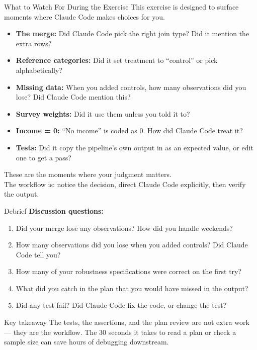 \begin{frame}{What to Watch For During the Exercise}
  This exercise is designed to surface moments where Claude Code makes choices for you.

  \vspace{0.5em}
  \begin{itemize}
    \small
    \item \textbf{The merge:} Did Claude Code pick the right join type? Did it mention the extra rows?
    \item \textbf{Reference categories:} Did it set treatment to ``control'' or pick alphabetically?
    \item \textbf{Missing data:} When you added controls, how many observations did you lose? Did Claude Code mention this?
    \item \textbf{Survey weights:} Did it use them unless you told it to?
    \item \textbf{Income = 0:} ``No income'' is coded as 0. How did Claude Code treat it?
    \item \textbf{Tests:} Did it copy the pipeline's own output in as an expected value, or edit one to get a pass?
  \end{itemize}

  \vspace{0.8em}
  \alert{These are the moments where your judgment matters.}\\
  The workflow is: notice the decision, direct Claude Code explicitly, then verify the output.
\end{frame}

\begin{frame}{Debrief}
  \textbf{Discussion questions:}

  \vspace{0.5em}
  \begin{enumerate}
    \small
    \item Did your merge lose any observations? How did you handle weekends?
    \item How many observations did you lose when you added controls? Did Claude Code tell you?
    \item How many of your robustness specifications were correct on the first try?
    \item What did you catch in the plan that you would have missed in the output?
    \item Did any test fail? Did Claude Code fix the code, or change the test?
  \end{enumerate}

  \vspace{0.5em}
  \begin{block}{Key takeaway}
    The tests, the assertions, and the plan review are not extra work --- they are the workflow. The 30 seconds it takes to read a plan or check a sample size can save hours of debugging downstream.
  \end{block}
\end{frame}
